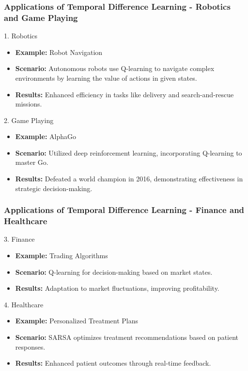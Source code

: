 \documentclass[aspectratio=169]{beamer}
\begin{document}
\begin{frame}[fragile]
    \frametitle{Applications of Temporal Difference Learning - Robotics and Game Playing}
    \begin{block}{1. Robotics}
        \begin{itemize}
            \item \textbf{Example:} Robot Navigation
            \item \textbf{Scenario:} Autonomous robots use Q-learning to navigate complex environments by learning the value of actions in given states.
            \item \textbf{Results:} Enhanced efficiency in tasks like delivery and search-and-rescue missions.
        \end{itemize}
    \end{block}
    
    \begin{block}{2. Game Playing}
        \begin{itemize}
            \item \textbf{Example:} AlphaGo
            \item \textbf{Scenario:} Utilized deep reinforcement learning, incorporating Q-learning to master Go.
            \item \textbf{Results:} Defeated a world champion in 2016, demonstrating effectiveness in strategic decision-making.
        \end{itemize}
    \end{block}
\end{frame}

\begin{frame}[fragile]
    \frametitle{Applications of Temporal Difference Learning - Finance and Healthcare}
    \begin{block}{3. Finance}
        \begin{itemize}
            \item \textbf{Example:} Trading Algorithms
            \item \textbf{Scenario:} Q-learning for decision-making based on market states.
            \item \textbf{Results:} Adaptation to market fluctuations, improving profitability.
        \end{itemize}
    \end{block}

    \begin{block}{4. Healthcare}
        \begin{itemize}
            \item \textbf{Example:} Personalized Treatment Plans
            \item \textbf{Scenario:} SARSA optimizes treatment recommendations based on patient responses.
            \item \textbf{Results:} Enhanced patient outcomes through real-time feedback.
        \end{itemize}
    \end{block}
\end{frame}
\end{document}
